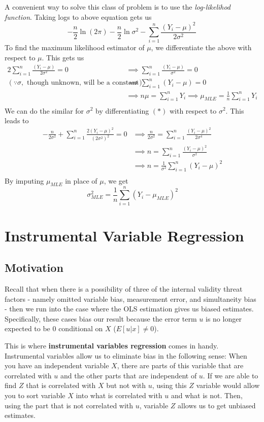 \documentclass[12pt]{article}
\theoremstyle{definition}
\theoremstyle{property}
\theoremstyle{assumption}
\theoremstyle{example}
\theoremstyle{comment}
\begin{document}
A convenient way to solve this class of problem is to use the \textit{log-likelihod function}. Taking logs to above equation gets us
\[
-\frac{n}{2}\ln{(2\pi)}-\frac{n}{2}\ln{\sigma^2}-\sum_{i=1}^n\frac{(Y_i-\mu)^2}{2\sigma^2} \ \tag{*}
\]
To find the maximum likelihood estimator of $\mu$, we differentiate the above with respect to $\mu$. This gets us
\[
\begin{aligned}
2\sum_{i=1}^n\frac{(Y_i-\mu)}{2\sigma^2}=0&\implies \sum_{i=1}^n\frac{(Y_i-\mu)}{\sigma^2}=0\\
(\because\sigma, \text{ though unknown, will be a constant })&\implies \sum_{i=1}^n(Y_i-\mu)=0\\
&\implies n\mu=\sum_{i=1}^nY_i\implies \mu_{MLE}=\frac{1}{n}\sum_{i=1}^nY_i\\
\end{aligned}
\]
We can do the similar for $\sigma^2$ by differentiating $(*)$ with respect to $\sigma^2$. This leads to
\[
\begin{aligned}
-\frac{n}{2\sigma^2}+\sum_{i=1}^n\frac{2(Y_i-\mu)^2}{(2\sigma^2)^2}=0&\implies \frac{n}{2\sigma^2}=\sum_{i=1}^n\frac{(Y_i-\mu)^2}{2\sigma^4}\\
&\implies n=\sum_{i=1}^n\frac{(Y_i-\mu)^2}{\sigma^2}\\
&\implies n=\frac{1}{\sigma^2}\sum_{i=1}^n(Y_i-\mu)^2\\
\end{aligned}
\]
By imputing $\mu_{MLE}$ in place of $\mu$, we get
\[
\sigma^2_{MLE}=\frac{1}{n}\sum_{i=1}^n(Y_i-\mu_{MLE})^2
\]


\section{Instrumental Variable Regression}
\subsection{Motivation}
Recall that when there is a possibility of three of the internal validity threat factors - namely omitted variable bias, measurement error, and simultaneity bias - then we run into the case where the OLS estimation gives us biased estimates. Specifically, these cases bias our result because the error term $u$ is no longer expected to be 0 conditional on $X$ ($E[u|x]\neq 0$). \par\medskip

This is where \textbf{instrumental variables regression} comes in handy. Instrumental variables allow us to eliminate bias in the following sense: When you have an independent variable $X$, there are parts of this variable that are correlated with $u$ and the other parts that are independent of $u$. If we are able to find $Z$ that is correlated with $X$ but not with $u$, using this $Z$ variable would allow you to sort variable $X$ into what is correlated with $u$ and what is not. Then, using the part that is not correlated with $u$, variable $Z$ allows us to get unbiased estimates. \par\medskip
\end{document}

